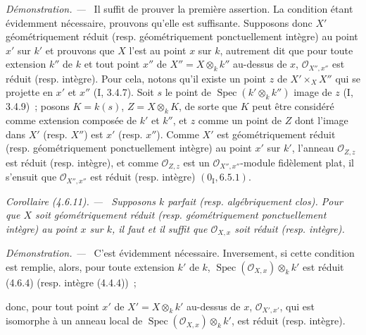 \documentclass[10pt,oneside]{book}
\newcommand{\oldpage}[2][]{%
  \setcounter{footnote}{0}%
  \marginpar{\scriptsize\textbf{#1}~|~#2}\ignorespaces}
\newenvironment{corollary}[1][]{%
  \par\medskip\noindent\itshape Corollaire (#1). ---\ }{\par}
\newenvironment{proof}{%
  \par\medskip\noindent\textit{Démonstration. ---\ }}{\par}
\begin{document}
\begin{proof}
Il suffit de prouver la première assertion. La condition étant évidemment
nécessaire, prouvons qu'elle est suffisante. Supposons donc $X'$
géométriquement réduit (resp. géométriquement ponctuellement intègre) au point
$x'$ sur $k'$ et prouvons que $X$ l'est au point $x$ sur $k$, autrement dit que
pour toute extension $k''$ de $k$ et tout point $x''$ de
$X''=X\otimes_k k''$ au-dessus de $x$, $\mathcal O_{X'',x''}$ est réduit (resp.
intègre). Pour cela, notons qu'il existe un point $z$ de $X'\times_X X''$ qui
se projette en $x'$ et $x''$ (I, 3.4.7). Soit $s$ le point de
$\operatorname{Spec}(k'\otimes_k k'')$ image de $z$ (I, 3.4.9)~; posons
$K=k(s)$, $Z=X\otimes_k K$, de sorte que $K$ peut être considéré comme
extension composée de $k'$ et $k''$, et $z$ comme un point de $Z$ dont l'image
dans $X'$ (resp. $X''$) est $x'$ (resp. $x''$). Comme $X'$ est
géométriquement réduit (resp. géométriquement ponctuellement intègre) au point
$x'$ sur $k'$, l'anneau $\mathcal O_{Z,z}$ est réduit (resp. intègre), et comme
$\mathcal O_{Z,z}$ est un $\mathcal O_{X'',x''}$-module fidèlement plat, il
s'ensuit que $\mathcal O_{X'',x''}$ est réduit (resp. intègre)
$(0_{\mathrm I},6.5.1)$.
\end{proof}

\begin{corollary}[4.6.11]
\label{IV.2.4.6.11-fr}
Supposons $k$ parfait (resp. algébriquement clos). Pour que $X$ soit
géométriquement réduit (resp. géométriquement ponctuellement intègre) au point
$x$ sur $k$, il faut et il suffit que $\mathcal O_{X,x}$ soit réduit (resp.
intègre).
\end{corollary}

\begin{proof}
C'est évidemment nécessaire. Inversement, si cette condition est remplie,
alors, pour toute extension $k'$ de $k$,
$\operatorname{Spec}(\mathcal O_{X,x})\otimes_k k'$ est réduit (4.6.4) (resp.
intègre (4.4.4))~;

\oldpage[IV-2]{71}

donc, pour tout point $x'$ de $X'=X\otimes_k k'$ au-dessus de $x$,
$\mathcal O_{X',x'}$, qui est isomorphe à un anneau local de
$\operatorname{Spec}(\mathcal O_{X,x})\otimes_k k'$, est réduit (resp.
intègre).
\end{proof}
\end{document}
